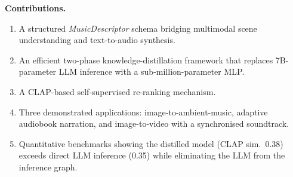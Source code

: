 \noindent\textbf{Contributions.}
\begin{enumerate}
  \item A structured \emph{MusicDescriptor} schema bridging multimodal scene
        understanding and text-to-audio synthesis.
  \item An efficient two-phase knowledge-distillation framework that replaces
        7B-parameter LLM inference with a sub-million-parameter MLP.
  \item A CLAP-based self-supervised re-ranking mechanism.
  \item Three demonstrated applications: image-to-ambient-music, adaptive
        audiobook narration, and image-to-video with a synchronised soundtrack.
  \item Quantitative benchmarks showing the distilled model (CLAP sim.\ 0.38)
        exceeds direct LLM inference (0.35) while eliminating the LLM from the
        inference graph.
\end{enumerate}

